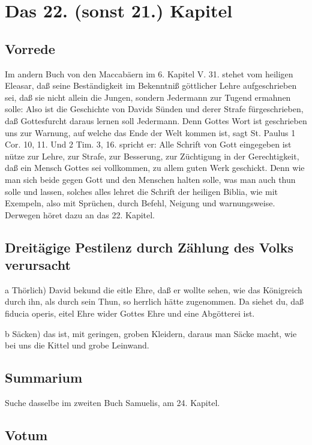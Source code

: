 \chapter{Das 22. (sonst 21.) Kapitel}

\section{Vorrede}

Im andern Buch von den Maccabäern im 6. Kapitel V. 31. stehet vom heiligen Eleasar, daß seine Beständigkeit im Bekenntniß göttlicher Lehre aufgeschrieben sei, daß sie nicht allein die Jungen, sondern Jedermann zur Tugend ermahnen solle: Also ist die Geschichte von Davids Sünden und derer Strafe fürgeschrieben, daß Gottesfurcht daraus lernen soll Jedermann. Denn Gottes Wort ist geschrieben uns zur Warnung, auf welche das Ende der Welt kommen ist, sagt St. Paulus 1 Cor. 10, 11. Und 2 Tim. 3, 16. spricht er: Alle Schrift von Gott eingegeben ist nütze zur Lehre, zur Strafe, zur Besserung, zur Züchtigung in der Gerechtigkeit, daß ein Mensch Gottes sei vollkommen, zu allem guten Werk geschickt. Denn wie man sich beide gegen Gott und den Menschen halten solle, was man auch thun solle und lassen, solches alles lehret die Schrift der heiligen Biblia, wie mit Exempeln, also mit Sprüchen, durch Befehl, Neigung und warnungsweise. Derwegen höret dazu an das 22. Kapitel.

\section[Dreitägige Pestilenz durch Zählung des Volks verursacht]{Dreitägige Pestilenz durch Zählung des Volks verursacht}

a Thörlich) David bekund die eitle Ehre, daß er wollte sehen, wie das Königreich durch ihn, als durch sein Thun, so herrlich hätte zugenommen. Da siehet du, daß fiducia operis, eitel Ehre wider Gottes Ehre und eine Abgötterei ist.

b Säcken) das ist, mit geringen, groben Kleidern, daraus man Säcke macht, wie bei uns die Kittel und grobe Leinwand.

\section{Summarium}

Suche dasselbe im zweiten Buch Samuelis, am 24. Kapitel.

\section{Votum}

